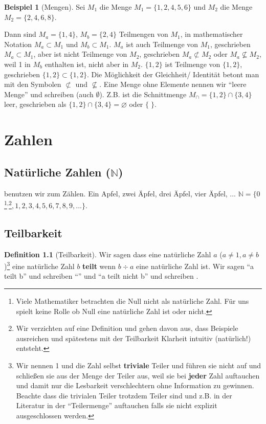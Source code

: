 \documentclass[a4paper]{book}%
\theoremstyle{definition}
\newtheorem{definition}{Definition}
\newtheorem{beispiel}{Beispiel}
\begin{document}
\begin{beispiel}[Mengen]
    Sei $M_1$ die Menge $M_1 = \{1,2,4,5,6\}$ und $M_2$ die Menge $M_2 = \{2,4,6,8\}$.

    Dann sind $M_a = \{1,4\}$, $M_b = \{2,4\}$ Teilmengen von $M_1$, in mathematischer Notation $M_a \subset M_1$ und $M_b \subset M_1$. $M_a$ ist auch Teilmenge von $M_1$, geschrieben $M_a \subset M_1$, aber ist nicht Teilmenge von $M_2$, geschrieben $M_a \not\subset M_2$ oder $M_a \nsubseteq M_2$, weil 1 in $M_b$ enthalten ist, nicht aber in $M_2$. $\{1,2\}$ ist Teilmenge von $\{1,2\}$, geschrieben $\{1,2\} \subset \{1,2\}$. Die Möglichkeit der Gleichheit/ Identität betont man mit den Symbolen $\not\subset$ und $\nsubseteq$. Eine Menge ohne Elemente nennen wir \enquote{leere Menge} und schreiben  (auch $\emptyset$). Z.B. ist die Schnittmenge $M_\cap = \{1,2\} \cap \{3,4\}$ leer, geschrieben als $\{1,2\} \cap \{3,4\} = \varnothing$ oder $\{ \; \}$.
\end{beispiel}


\chapter{Zahlen}\label{chapter:Zahlen}

\section{Natürliche Zahlen ($\mathbb{N}$)}

\textbf{} benutzen wir zum Zählen. Ein Apfel, zwei Äpfel, drei Äpfel, vier Äpfel, ... $\mathbb{N} = \{ 0$\footnote{Viele Mathematiker betrachten die Null nicht als natürliche Zahl. Für uns spielt keine Rolle ob Null eine natürliche Zahl ist oder nicht.}\textsuperscript{,}\footnote{Wir verzichten auf eine Definition und gehen davon aus, dass Beispiele ausreichen und spätestens mit der Teilbarkeit Klarheit intuitiv (natürlich!) entsteht.}$, 1, 2, 3, 4, 5, 6, 7, 8, 9, ...\}$.


\section{Teilbarkeit}\label{def:teilbarkeit}

\begin{definition}[Teilbarkeit]
    Wir sagen dass eine natürliche Zahl $a$ ($a \neq 1, a \neq b$)\footnote{Wir nennen 1 und die Zahl selbst \textbf{triviale} Teiler und führen sie nicht auf und schließen sie aus der Menge der Teiler aus, weil sie bei \textbf{jeder} Zahl auftauchen und damit nur die Lesbarkeit verschlechtern ohne Information zu gewinnen. Beachte dass die trivialen Teiler trotzdem Teiler sind und z.B. in der Literatur in der \enquote{Teilermenge} auftauchen falls sie nicht explizit ausgeschlossen werden.} eine natürliche Zahl $b$ \textbf{teilt} wenn $b \div a$ eine natürliche Zahl ist. Wir sagen \enquote{a teilt b} und schreiben \enquote{} und \enquote{a teilt nicht b} und schreiben .
\end{definition}
\end{document}
